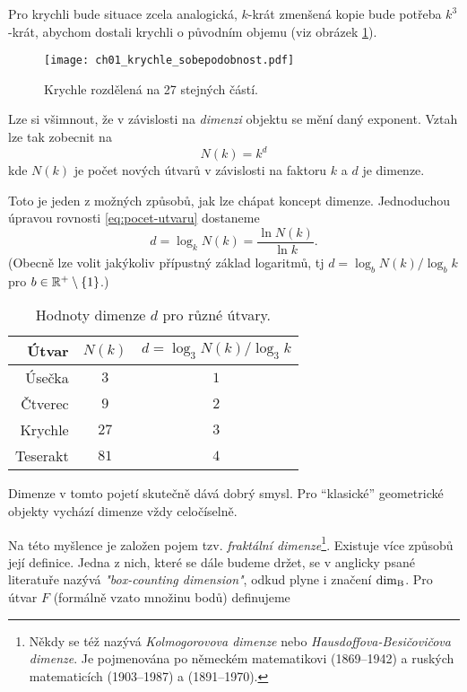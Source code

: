 Pro krychli bude situace zcela analogická, $k$-krát zmenšená kopie bude potřeba $k^3$-krát, abychom dostali krychli o původním objemu (viz obrázek \ref{fig:krychle-sobepodobnost}).
\begin{figure}[h]
    \centering
    \texttt{[image: ch01\_krychle\_sobepodobnost.pdf]}
    \caption{Krychle rozdělená na 27 stejných částí.}
    \label{fig:krychle-sobepodobnost}
\end{figure}
Lze si všimnout, že v závislosti na \emph{dimenzi} objektu se mění daný exponent. Vztah lze tak zobecnit na
\begin{equation}\label{eq:pocet-utvaru}
    N(k)=k^d
\end{equation}
kde $N(k)$ je počet nových útvarů v závislosti na faktoru $k$ a $d$ je dimenze.\par
Toto je jeden z možných způsobů, jak lze chápat koncept dimenze. Jednoduchou úpravou rovnosti \eqref{eq:pocet-utvaru} dostaneme
\[d=\log_k{N(k)}=\dfrac{\ln{N(k)}}{\ln{k}}.\]
(Obecně lze volit jakýkoliv přípustný základ logaritmů, tj $d=\log_b{N(k)}/\log_b{k}$ pro $b\in\mathbb{R}^+\setminus\left\{1\right\}$.)
\begin{table}[h]
    \centering
    \begin{tabular}{r|cc}
    Útvar    & $N(k)$ & $d=\log_3{N(k)}/\log_3{k}$ \\ \hline
    Úsečka   & $3$      & $1$                          \\
    Čtverec  & $9$      & $2$                          \\
    Krychle  & $27$     & $3$                          \\
    Teserakt & $81$     & $4$                          \\
    \end{tabular}
    \caption{Hodnoty dimenze $d$ pro různé útvary.}
    \label{table:eukleides-dimenze}
\end{table}
Dimenze v tomto pojetí skutečně dává dobrý smysl. Pro ``klasické'' geometrické objekty vychází dimenze vždy celočíselně.\par
Na této myšlence je založen pojem tzv. \emph{fraktální dimenze}\footnote{Někdy se též nazývá \emph{Kolmogorovova dimenze} nebo \emph{Hausdoffova-Besičovičova dimenze}. Je pojmenována po německém matematikovi  (1869--1942) a ruských matematicích  (1903--1987) a  (1891--1970).}. Existuje více způsobů její definice. Jedna z nich, které se dále budeme držet, se v anglicky psané literatuře nazývá \emph{"box-counting dimension"}, odkud plyne i značení $\operatorname{dim_B}$. Pro útvar $F$ (formálně vzato množinu bodů) definujeme 
